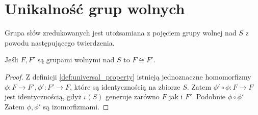 \section{Unikalność grup wolnych}
Grupa słów zredukowanych jest utożsamiana z pojęciem grupy wolnej nad $S$ z
powodu następującego twierdzenia.

\begin{theorem}
  Jeśli $F, F'$ są grupami wolnymi nad $S$ to $F \cong F'$.
\end{theorem}
\begin{proof}
  Z definicji \ref{def:universal_property} istnieją jednoznaczne homomorfizmy
  $\phi: F \rightarrow F', \phi': F' \rightarrow F$, które są identycznością na
  zbiorze $S$. Zatem $\phi' \circ \phi: F \rightarrow F$ jest identycznością,
  gdyż $\iota(S)$ generuje zarówno $F$ jak i $F'$. Podobnie $\phi \circ \phi'$
  Zatem $\phi, \phi'$ są izomorfizmami.
\end{proof}
